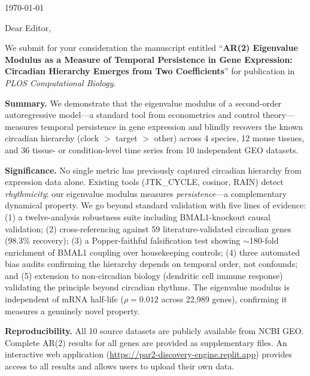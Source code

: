 \documentclass[11pt,letterpaper]{article}
\begin{document}
\today

\vspace{1cm}

Dear Editor,

\vspace{0.5cm}

We submit for your consideration the manuscript entitled ``\textbf{AR(2) Eigenvalue Modulus as a Measure of Temporal Persistence in Gene Expression: Circadian Hierarchy Emerges from Two Coefficients}'' for publication in \textit{PLOS Computational Biology}.

\vspace{0.3cm}

\textbf{Summary.} We demonstrate that the eigenvalue modulus of a second-order autoregressive model---a standard tool from econometrics and control theory---measures temporal persistence in gene expression and blindly recovers the known circadian hierarchy (clock $>$ target $>$ other) across 4 species, 12 mouse tissues, and 36 tissue- or condition-level time series from 10 independent GEO datasets.

\vspace{0.3cm}

\textbf{Significance.} No single metric has previously captured circadian hierarchy from expression data alone. Existing tools (JTK\_CYCLE, cosinor, RAIN) detect \textit{rhythmicity}; our eigenvalue modulus measures \textit{persistence}---a complementary dynamical property. We go beyond standard validation with five lines of evidence: (1) a twelve-analysis robustness suite including BMAL1-knockout causal validation; (2) cross-referencing against 59 literature-validated circadian genes (98.3\% recovery); (3) a Popper-faithful falsification test showing $\sim$180-fold enrichment of BMAL1 coupling over housekeeping controls; (4) three automated bias audits confirming the hierarchy depends on temporal order, not confounds; and (5) extension to non-circadian biology (dendritic cell immune response) validating the principle beyond circadian rhythms. The eigenvalue modulus is independent of mRNA half-life ($\rho = 0.012$ across 22,989 genes), confirming it measures a genuinely novel property.

\vspace{0.3cm}

\textbf{Reproducibility.} All 10 source datasets are publicly available from NCBI GEO. Complete AR(2) results for all genes are provided as supplementary files. An interactive web application (\url{https://par2-discovery-engine.replit.app}) provides access to all results and allows users to upload their own data.
\end{document}
